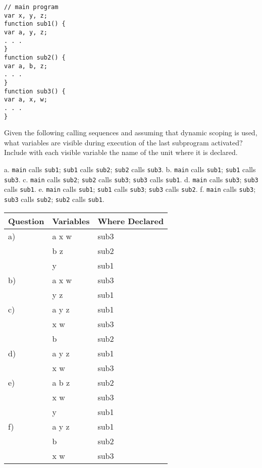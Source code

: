 \documentclass[11pt]{article}
\begin{document}
\begin{verbatim}
// main program
var x, y, z;
function sub1() {
var a, y, z;
. . .
}
function sub2() {
var a, b, z;
. . .
}
function sub3() {
var a, x, w;
. . .
}  
\end{verbatim}


Given the following calling sequences and assuming that dynamic scoping
is used, what variables are visible during execution of the last subprogram
activated? Include with each visible variable the name of the unit
where it is declared.


a. \texttt{main} calls \texttt{sub1}; \texttt{sub1} calls \texttt{sub2}; \texttt{sub2} calls \texttt{sub3}.
b. \texttt{main} calls \texttt{sub1}; \texttt{sub1} calls \texttt{sub3}.
c. \texttt{main} calls \texttt{sub2}; \texttt{sub2} calls \texttt{sub3}; \texttt{sub3} calls \texttt{sub1}.
d. \texttt{main} calls \texttt{sub3}; \texttt{sub3} calls \texttt{sub1}.
e. \texttt{main} calls \texttt{sub1}; \texttt{sub1} calls \texttt{sub3}; \texttt{sub3} calls \texttt{sub2}.
f. \texttt{main} calls \texttt{sub3}; \texttt{sub3} calls \texttt{sub2}; \texttt{sub2} calls \texttt{sub1}.

\begin{center}
\begin{tabular}{lll}
\hline
Question & Variables & Where Declared\\
\hline
a) & a x w & sub3\\
 & b z & sub2\\
 & y & sub1\\
\hline
b) & a x w & sub3\\
 & y z & sub1\\
\hline
c) & a y z & sub1\\
 & x w & sub3\\
 & b & sub2\\
\hline
d) & a y z & sub1\\
 & x w & sub3\\
\hline
e) & a b z & sub2\\
 & x w & sub3\\
 & y & sub1\\
\hline
f) & a y z & sub1\\
 & b & sub2\\
 & x w & sub3\\
\hline
\end{tabular}
\end{center}
\end{document}
